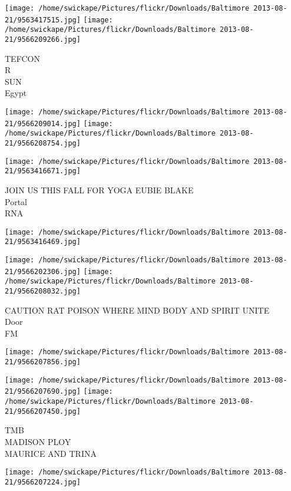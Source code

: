 \documentclass[10pt,letterpaper]{article}
\begin{document}
\texttt{[image: /home/swickape/Pictures/flickr/Downloads/Baltimore 2013-08-21/9563417515.jpg]}
\texttt{[image: /home/swickape/Pictures/flickr/Downloads/Baltimore 2013-08-21/9566209266.jpg]}

TEFCON\\
R\\
SUN\\
Egypt\\
\pagebreak

\texttt{[image: /home/swickape/Pictures/flickr/Downloads/Baltimore 2013-08-21/9566209014.jpg]}
\texttt{[image: /home/swickape/Pictures/flickr/Downloads/Baltimore 2013-08-21/9566208754.jpg]}

\texttt{[image: /home/swickape/Pictures/flickr/Downloads/Baltimore 2013-08-21/9563416671.jpg]}

JOIN US THIS FALL FOR YOGA EUBIE BLAKE\\
Portal\\
RNA\\
\pagebreak

\texttt{[image: /home/swickape/Pictures/flickr/Downloads/Baltimore 2013-08-21/9563416469.jpg]}

\vspace{0.25in}
\texttt{[image: /home/swickape/Pictures/flickr/Downloads/Baltimore 2013-08-21/9566202306.jpg]}
\texttt{[image: /home/swickape/Pictures/flickr/Downloads/Baltimore 2013-08-21/9566208032.jpg]}

CAUTION RAT POISON WHERE MIND BODY AND SPIRIT UNITE\\
Door\\
FM\\
\pagebreak

\texttt{[image: /home/swickape/Pictures/flickr/Downloads/Baltimore 2013-08-21/9566207856.jpg]}

\vspace{0.25in}
\texttt{[image: /home/swickape/Pictures/flickr/Downloads/Baltimore 2013-08-21/9566207690.jpg]}
\texttt{[image: /home/swickape/Pictures/flickr/Downloads/Baltimore 2013-08-21/9566207450.jpg]}

TMB\\
MADISON PLOY\\
MAURICE AND TRINA\\
\pagebreak

\texttt{[image: /home/swickape/Pictures/flickr/Downloads/Baltimore 2013-08-21/9566207224.jpg]}
\end{document}
